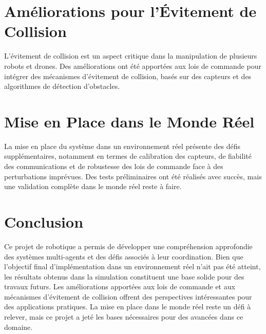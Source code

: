 \documentclass[a4paper,12pt]{article}
\begin{document}
\section*{Améliorations pour l'Évitement de Collision}
L'évitement de collision est un aspect critique dans la manipulation de plusieurs robots et drones. Des améliorations ont été apportées aux lois de commande pour intégrer des mécanismes d'évitement de collision, basés sur des capteurs et des algorithmes de détection d'obstacles.

\section*{Mise en Place dans le Monde Réel}
La mise en place du système dans un environnement réel présente des défis supplémentaires, notamment en termes de calibration des capteurs, de fiabilité des communications et de robustesse des lois de commande face à des perturbations imprévues. Des tests préliminaires ont été réalisés avec succès, mais une validation complète dans le monde réel reste à faire.

\section*{Conclusion}
Ce projet de robotique a permis de développer une compréhension approfondie des systèmes multi-agents et des défis associés à leur coordination. Bien que l'objectif final d'implémentation dans un environnement réel n'ait pas été atteint, les résultats obtenus dans la simulation constituent une base solide pour des travaux futurs. Les améliorations apportées aux lois de commande et aux mécanismes d'évitement de collision offrent des perspectives intéressantes pour des applications pratiques. La mise en place dans le monde réel reste un défi à relever, mais ce projet a jeté les bases nécessaires pour des avancées dans ce domaine.
\end{document}
